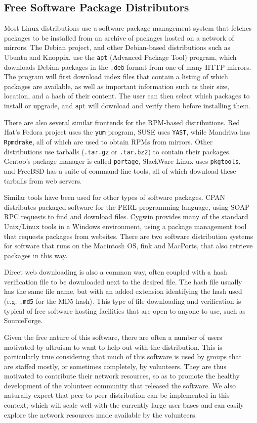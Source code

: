 \documentclass[conference]{IEEEtran}
\begin{document}
\subsection{Free Software Package Distributors}
\label{examples}

Most Linux distributions use a software package management system
that fetches packages to be installed from an archive of packages
hosted on a network of mirrors. The Debian project, and other
Debian-based distributions such as Ubuntu and Knoppix, use the
\texttt{apt} (Advanced Package Tool) program, which downloads Debian
packages in the \texttt{.deb} format from one of many HTTP mirrors.
The program will first download index files that contain a listing
of which packages are available, as well as important information
such as their size, location, and a hash of their content. The user
can then select which packages to install or upgrade, and
\texttt{apt} will download and verify them before installing them.

There are also several similar frontends for the RPM-based
distributions. Red Hat's Fedora project uses the \texttt{yum}
program, SUSE uses \texttt{YAST}, while Mandriva has
\texttt{Rpmdrake}, all of which are used to obtain RPMs from
mirrors. Other distributions use tarballs (\texttt{.tar.gz} or
\texttt{.tar.bz2}) to contain their packages. Gentoo's package
manager is called \texttt{portage}, SlackWare Linux uses
\texttt{pkgtools}, and FreeBSD has a suite of command-line tools,
all of which download these tarballs from web servers.

Similar tools have been used for other types of software packages. CPAN
distributes packaged software for the PERL
programming language, using SOAP RPC requests to find and download
files. Cygwin provides many of the
standard Unix/Linux tools in a Windows environment, using a
package management tool that requests packages from websites. There
are two software distribution systems for software that runs on the Macintosh OS, fink and
MacPorts, that also retrieve packages in this way.

Direct web downloading is also a common way, often coupled with a hash
verification file to be downloaded next to the desired
file. The hash file usually has the same file name, but with an
added extension identifying the hash used (e.g. \texttt{.md5} for
the MD5 hash). This type of file downloading and verification is
typical of free software hosting facilities that are open to anyone
to use, such as SourceForge.


Given the free nature of this software, there are often a number of users
motivated by altruism to want to help out with the distribution.
This is particularly true considering that much of this software is used by
groups that are staffed mostly, or sometimes completely, by
volunteers. They are thus motivated to contribute their network resources, so as to promote the healthy development
of the volunteer community that released the software.
We also naturally expect that peer-to-peer distribution can be implemented in
this context, which will scale well with the currently large user bases
and can easily explore the network resources made available by
the volunteers.
\end{document}
